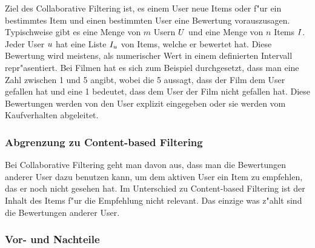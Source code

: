 \documentclass[a4paper, 12pt]{article}
\begin{document}
Ziel des Collaborative Filtering ist, es einem User neue Items oder f"ur ein bestimmtes Item und einen bestimmten User eine Bewertung vorauszusagen. Typischweise gibt es eine Menge von $m$ Usern  $\mathnormal{U}$ und eine Menge von $n$ Items $\mathnormal{I}$. Jeder User $\mathnormal{u}$ hat eine Liste $\mathnormal{I_u}$ von Items, welche er bewertet hat. Diese Bewertung wird meistens, als numerischer Wert in einem definierten Intervall repr"asentiert. Bei Filmen hat es sich zum Beispiel durchgesetzt, dass man eine Zahl zwischen 1 und 5 angibt, wobei die 5 aussagt, dass der Film dem User gefallen hat und eine 1 bedeutet, dass dem User der Film nicht gefallen hat. Diese Bewertungen werden von den User explizit eingegeben oder sie werden vom Kaufverhalten abgeleitet.

\subsubsection{Abgrenzung zu Content-based Filtering}
\label{sec:definitioncf}

Bei Collaborative Filtering geht man davon aus, dass man die Bewertungen anderer User dazu benutzen kann, um dem aktiven User ein Item zu empfehlen, das er noch nicht gesehen hat. Im Unterschied zu Content-based Filtering ist der Inhalt des Items f"ur die Empfehlung nicht relevant. Das einzige was z"ahlt sind die Bewertungen anderer User.

\subsubsection{Vor- und Nachteile}
\label{sec:advandage}
\end{document}
